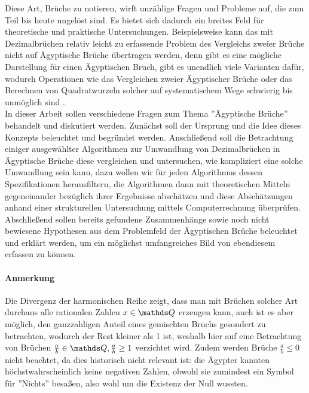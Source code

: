Diese Art, Brüche zu notieren, wirft unzählige Fragen und Probleme auf, die zum Teil bis heute ungelöst sind. Es bietet sich dadurch ein breites Feld für theoretische und praktische Untersuchungen. Beispielsweise kann das mit Dezimalbrüchen relativ leicht zu erfassende Problem des Vergleichs zweier Brüche nicht auf Ägyptische Brüche übertragen werden, denn gibt es eine mögliche Darstellung für einen Ägyptischen Bruch, gibt es unendlich viele Varianten dafür, wodurch Operationen wie das Vergleichen zweier Ägyptischer Brüche oder das Berechnen von Quadratwurzeln solcher auf systematischem Wege schwierig bis unmöglich sind \cite[S. 62]{Resnikoff1984}.\\
In dieser Arbeit sollen verschiedene Fragen zum Thema ''Ägyptische Brüche'' behandelt und diskutiert werden. Zunächst soll der Ursprung und die Idee dieses Konzepts beleuchtet und begründet werden. Anschließend soll die Betrachtung einiger ausgewählter Algorithmen zur Umwandlung von Dezimalbrüchen in Ägyptische Brüche diese vergleichen und untersuchen, wie kompliziert eine solche Umwandlung sein kann, dazu wollen wir für jeden Algorithmus dessen Spezifikationen herausfiltern, die Algorithmen dann mit theoretischen Mitteln gegeneinander bezüglich ihrer Ergebnisse abschätzen und diese Abschätzungen anhand einer strukturellen Untersuchung mittels Computerrechnung überprüfen. Abschließend sollen bereits gefundene Zusammenhänge sowie noch nicht bewiesene Hypothesen aus dem Problemfeld der Ägyptischen Brüche beleuchtet und erklärt werden, um ein möglichst umfangreiches Bild von ebendiesem erfassen zu können.\\
\paragraph{Anmerkung}Die Divergenz der harmonischen Reihe zeigt, dass man mit Brüchen solcher Art durchaus alle rationalen Zahlen $x \in \Q$ erzeugen kann, auch ist es aber möglich, den ganzzahligen Anteil eines gemischten Bruchs gesondert zu betrachten, wodurch der Rest kleiner als 1 ist, weshalb hier auf eine Betrachtung von Brüchen $\frac{a}{b}\in \Q, \frac{a}{b} \geq 1$ verzichtet wird. Zudem werden Brüche $\frac{a}{b} \leq 0$ nicht beachtet, da dies historisch nicht relevant ist: die Ägypter kannten höchstwahrscheinlich keine negativen Zahlen, obwohl sie zumindest ein Symbol für ''Nichts'' besaßen, also wohl um die Existenz der Null wussten.